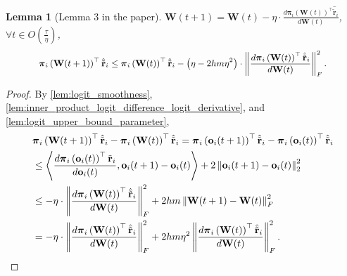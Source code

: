 \documentclass[10pt]{article}
\def\rvo{{\mathbf{o}}}
\def\rvo{{\mathbf{o}}}
\def\rvtilder{{\tilde{\mathbf{r}}}}
\newtheorem{lem}{Lemma}
\def\rvpi{{\boldsymbol{\pi}}}
\def\rmW{{\mathbf{W}}}
\begin{document}
\begin{lem}[Lemma 3 in the paper]
\label{lem:parameter_smoothness}
    $\rmW(t+1) = \rmW(t) - \eta \cdot \frac{d \rvpi_i\left(\rmW(t)\right)^\top \hat{\rvtilder}_i}{d \rmW(t)}$, $\forall t \in O\left( \frac{\tau}{\eta}\right)$,
\begin{equation}
\label{eq:parameter_smoothness}
\begin{split}
\small
    \rvpi_i\left( \rmW(t+1) \right)^\top \hat{\rvtilder}_i \le \rvpi_i\left( \rmW(t) \right)^\top \hat{\rvtilder}_i - \left( \eta - 2 h m \eta^2 \right) \cdot \left\| \frac{d \rvpi_i\left( \rmW(t) \right)^\top \hat{\rvtilder}_i}{d \rmW(t)} \right\|_F^2.
\end{split}
\end{equation}
\end{lem}
\begin{proof}
    By \cref{lem:logit_smoothness}, \cref{lem:inner_product_logit_difference_logit_derivative}, and \cref{lem:logit_upper_bound_parameter},
\begin{equation*}
\begin{split}
    &\rvpi_i\left( \rmW(t+1) \right)^\top \hat{\rvtilder}_i - \rvpi_i\left( \rmW(t) \right)^\top \hat{\rvtilder}_i = \rvpi_i\left( \rvo_i(t+1) \right)^\top \hat{\rvtilder}_i - \rvpi_i\left( \rvo_i(t) \right)^\top \hat{\rvtilder}_i \\
    &\le \left\langle \frac{d \rvpi_i\left( \rvo_i(t) \right)^\top \rvtilder_i}{d \rvo_i(t)}, \rvo_i(t+1) - \rvo_i(t) \right\rangle + 2 \left\| \rvo_i(t+1) - \rvo_i(t)  \right\|_2^2 \\
    &\le - \eta \cdot \left\| \frac{d \rvpi_i\left(\rmW(t)\right)^\top \hat{\rvtilder}_i}{d \rmW(t)} \right\|_F^2 + 2 h m \left\| \rmW(t+1) - \rmW(t) \right\|_F^2 \\
    &= - \eta \cdot \left\| \frac{d \rvpi_i\left(\rmW(t)\right)^\top \hat{\rvtilder}_i}{d \rmW(t)} \right\|_F^2 + 2 h m \eta^2 \left\| \frac{d \rvpi_i\left(\rmW(t)\right)^\top \hat{\rvtilder}_i}{d \rmW(t)} \right\|_F^2. \qedhere
\end{split}
\end{equation*}
\end{proof}
\end{document}
